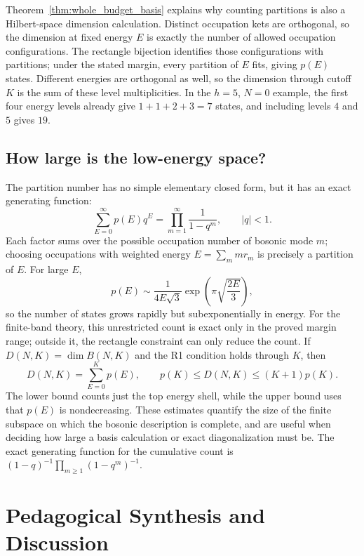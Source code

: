 Theorem~\ref{thm:whole_budget_basis} explains why counting partitions is
also a Hilbert-space dimension calculation. Distinct occupation kets are
orthogonal, so the dimension at fixed energy $E$ is exactly the number of
allowed occupation configurations. The rectangle bijection identifies
those configurations with partitions; under the stated margin, every
partition of $E$ fits, giving $p(E)$ states. Different energies are
orthogonal as well, so the dimension through cutoff $K$ is the sum of these
level multiplicities. In the $h=5$, $N=0$ example, the first four energy
levels already give $1+1+2+3=7$ states, and including levels $4$ and $5$
gives $19$.

\subsection{How large is the low-energy space?}
\begin{remark}
The partition number has no simple elementary closed form, but it has an
exact generating function:
\begin{equation}
\sum_{E=0}^{\infty}p(E)q^E=\prod_{m=1}^{\infty}\frac{1}{1-q^m},
\qquad |q|<1.
\end{equation}
Each factor sums over the possible occupation number of bosonic mode $m$;
choosing occupations with weighted energy $E=\sum_m m r_m$ is precisely a
partition of $E$. For large $E$,
\begin{equation}
p(E)\sim \frac{1}{4E\sqrt{3}}\exp\!\left(\pi\sqrt{\frac{2E}{3}}\right),
\end{equation}
so the number of states grows rapidly but subexponentially in energy. For
the finite-band theory, this unrestricted count is exact only in the
proved margin range; outside it, the rectangle constraint can only reduce
the count. If $D(N,K)=\dim B(N,K)$ and the R1 condition holds through $K$,
then
\begin{equation}
D(N,K)=\sum_{E=0}^K p(E),\qquad
p(K)\le D(N,K)\le (K+1)p(K).
\end{equation}
The lower bound counts just the top energy shell, while the upper bound uses
that $p(E)$ is nondecreasing. These estimates quantify the size of the
finite subspace on which the bosonic description is complete, and are
useful when deciding how large a basis calculation or exact diagonalization
must be. The exact generating function for the cumulative count is
$(1-q)^{-1}\prod_{m\ge1}(1-q^m)^{-1}$.
\end{remark}


\section{Pedagogical Synthesis and Discussion}

